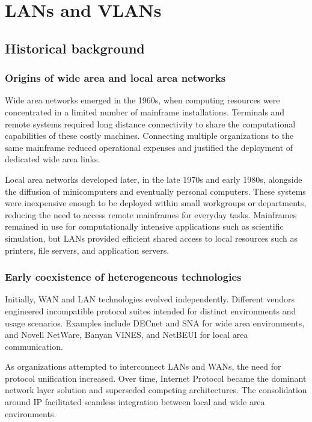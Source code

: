 \chapter{LANs and VLANs}

\section{Historical background}

\subsection{Origins of wide area and local area networks}

Wide area networks emerged in the 1960s, when computing resources were concentrated in a limited number of mainframe installations. Terminals and remote systems required long distance connectivity to share the computational capabilities of these costly machines. Connecting multiple organizations to the same mainframe reduced operational expenses and justified the deployment of dedicated wide area links.

Local area networks developed later, in the late 1970s and early 1980s, alongside the diffusion of minicomputers and eventually personal computers. These systems were inexpensive enough to be deployed within small workgroups or departments, reducing the need to access remote mainframes for everyday tasks. Mainframes remained in use for computationally intensive applications such as scientific simulation, but LANs provided efficient shared access to local resources such as printers, file servers, and application servers.

\subsection{Early coexistence of heterogeneous technologies}

Initially, WAN and LAN technologies evolved independently. Different vendors engineered incompatible protocol suites intended for distinct environments and usage scenarios. Examples include DECnet and SNA for wide area environments, and Novell NetWare, Banyan VINES, and NetBEUI for local area communication.

As organizations attempted to interconnect LANs and WANs, the need for protocol unification increased. Over time, Internet Protocol became the dominant network layer solution and superseded competing architectures. The consolidation around IP facilitated seamless integration between local and wide area environments.

